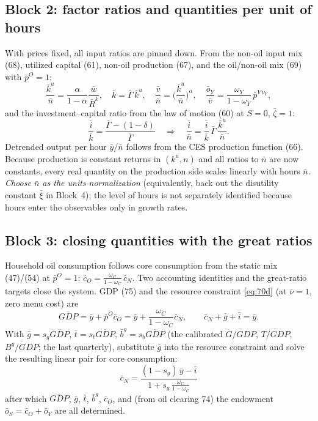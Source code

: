 \subsection{Block 2: factor ratios and quantities per unit of hours}
With prices fixed, all input ratios are pinned down. From the non-oil input mix (68), utilized capital
(61), non-oil production (67), and the oil/non-oil mix (69) with $\bar p^O=1$:
\begin{equation}\label{eq:ss-ratios}
\frac{\bar k^u}{\bar n}=\frac{\alpha}{1-\alpha}\frac{\bar w}{\bar R^k},\quad
\bar k=\bar\Gamma\,\bar k^u,\quad
\frac{\bar v}{\bar n}=\Big(\frac{\bar k^u}{\bar n}\Big)^{\alpha},\quad
\frac{\bar o_Y}{\bar v}=\frac{\omega_Y}{1-\omega_Y}\,\bar p^{V\,\nu_Y},
\end{equation}
and the investment--capital ratio from the law of motion (60) at $S=0$, $\bar\zeta=1$:
\begin{equation}\label{eq:ss-ik}
\frac{\bar i}{\bar k}=\frac{\bar\Gamma-(1-\delta)}{\bar\Gamma}
\quad\Longrightarrow\quad \frac{\bar i}{\bar n}=\frac{\bar i}{\bar k}\,\bar\Gamma\,\frac{\bar k^u}{\bar n}.
\end{equation}
Detrended output per hour $\bar y/\bar n$ follows from the CES production function (66). Because
production is constant returns in $(k^u,n)$ and all ratios to $\bar n$ are now constants, every
real quantity on the production side scales linearly with hours $\bar n$. \emph{Choose $\bar n$ as the
units normalization} (equivalently, back out the disutility constant $\bar\xi$ in Block~4); the level
of hours is not separately identified because hours enter the observables only in growth rates.

\subsection{Block 3: closing quantities with the great ratios}
Household oil consumption follows core consumption from the static mix (47)/(54) at $\bar p^O=1$:
$\bar c_O=\tfrac{\omega_C}{1-\omega_C}\,\bar c_N$. Two accounting identities and the great-ratio targets
close the system. GDP (75) and the resource constraint \eqref{eq:70d} (at $\bar\nu=1$, zero menu cost)
are
\begin{equation}\label{eq:ss-gdp-rc}
\overline{GDP}=\bar y+\bar p^O\bar c_O=\bar y+\frac{\omega_C}{1-\omega_C}\bar c_N,
\qquad
\bar c_N+\bar g+\bar i=\bar y .
\end{equation}
With $\bar g=s_g\overline{GDP}$, $\bar t=s_t\overline{GDP}$, $\bar b^g=s_b\overline{GDP}$ (the calibrated
$\overline{G/GDP}$, $\overline{T/GDP}$, $\overline{B^g/GDP}$; the last quarterly), substitute
$\bar g$ into the resource constraint and solve the resulting linear pair for core consumption:
\begin{equation}\label{eq:ss-cn}
\boxed{\,\bar c_N=\frac{(1-s_g)\,\bar y-\bar i}{1+s_g\,\tfrac{\omega_C}{1-\omega_C}}\,}
\end{equation}
after which $\overline{GDP}$, $\bar g$, $\bar t$, $\bar b^g$, $\bar c_O$, and (from oil clearing 74)
the endowment $\bar o_S=\bar c_O+\bar o_Y$ are all determined.

